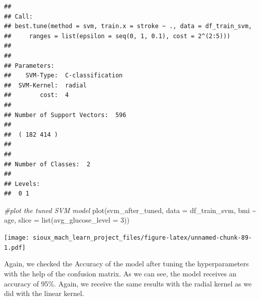 \documentclass[
]{article}
\newenvironment{Shaded}{\begin{snugshade}}{\end{snugshade}}
\newcommand{\AttributeTok}[1]{\textcolor[rgb]{0.77,0.63,0.00}{#1}}
\newcommand{\CommentTok}[1]{\textcolor[rgb]{0.56,0.35,0.01}{\textit{#1}}}
\newcommand{\DecValTok}[1]{\textcolor[rgb]{0.00,0.00,0.81}{#1}}
\newcommand{\FunctionTok}[1]{\textcolor[rgb]{0.00,0.00,0.00}{#1}}
\newcommand{\NormalTok}[1]{#1}
\newcommand{\OtherTok}[1]{\textcolor[rgb]{0.56,0.35,0.01}{#1}}
\newcommand{\SpecialCharTok}[1]{\textcolor[rgb]{0.00,0.00,0.00}{#1}}
\renewcommand{\=}[1]{\stackrel{#1}{=}}
\theoremstyle{definition}
\theoremstyle{remark}
\begin{document}
\begin{verbatim}
## 
## Call:
## best.tune(method = svm, train.x = stroke ~ ., data = df_train_svm, 
##     ranges = list(epsilon = seq(0, 1, 0.1), cost = 2^(2:5)))
## 
## 
## Parameters:
##    SVM-Type:  C-classification 
##  SVM-Kernel:  radial 
##        cost:  4 
## 
## Number of Support Vectors:  596
## 
##  ( 182 414 )
## 
## 
## Number of Classes:  2 
## 
## Levels: 
##  0 1
\end{verbatim}

\begin{Shaded}
\begin{Highlighting}[]
\CommentTok{\#plot the tuned SVM model}
\FunctionTok{plot}\NormalTok{(svm\_after\_tuned, }\AttributeTok{data =}\NormalTok{ df\_train\_svm, bmi }\SpecialCharTok{\textasciitilde{}}\NormalTok{ age, }\AttributeTok{slice =} \FunctionTok{list}\NormalTok{(}\AttributeTok{avg\_glucose\_level =} \DecValTok{3}\NormalTok{))}
\end{Highlighting}
\end{Shaded}

\texttt{[image: sioux\_mach\_learn\_project\_files/figure-latex/unnamed-chunk-89-1.pdf]}

Again, we checked the Accuracy of the model after tuning the hyperparameters with the help of the confusion matrix. As we can see, the model receives an accuracy of 95\%. Again, we receive the same results with the radial kernel as we did with the linear kernel.

\begin{Shaded}
\end{Shaded}
\end{document}
